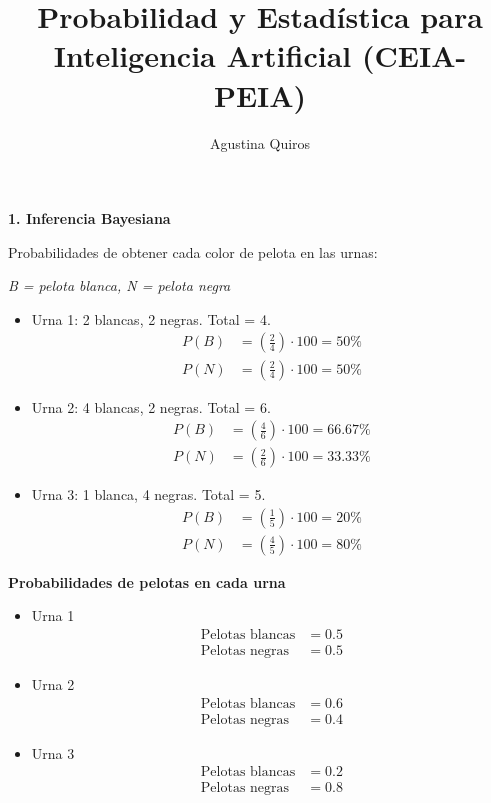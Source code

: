 \documentclass{article}
\title{\bf Probabilidad y Estadística para Inteligencia Artificial (CEIA-PEIA)}
\author{Agustina Quiros}
\begin{document}
\maketitle

{\bfseries 1. Inferencia Bayesiana} 

Probabilidades de obtener cada color de pelota en las urnas:

\textit{B = pelota blanca, N = pelota negra} 

\begin{itemize}
    \item Urna 1: 2 blancas, 2 negras. Total = 4.
    \begin{align*}
        P(B) &= \left(\frac{2}{4}\right) \cdot 100 = 50\% \\
        P(N) &= \left(\frac{2}{4}\right) \cdot 100 = 50\%
    \end{align*}
    \item Urna 2: 4 blancas, 2 negras. Total = 6.
    \begin{align*}
        P(B) &= \left(\frac{4}{6}\right) \cdot 100 = 66.67\% \\
        P(N) &= \left(\frac{2}{6}\right) \cdot 100 = 33.33\%
    \end{align*}
    \item Urna 3: 1 blanca, 4 negras. Total = 5.
    \begin{align*}
        P(B) &= \left(\frac{1}{5}\right) \cdot 100 = 20\% \\
        P(N) &= \left(\frac{4}{5}\right) \cdot 100 = 80\%
    \end{align*}
\end{itemize}

{\bfseries Probabilidades de pelotas en cada urna}
\begin{itemize}
    \item Urna 1
    \begin{align*}
        \text{Pelotas blancas} &= 0.5 \\
        \text{Pelotas negras} &= 0.5
    \end{align*}
    \item Urna 2
    \begin{align*}
        \text{Pelotas blancas} &= 0.6 \\
        \text{Pelotas negras} &= 0.4
    \end{align*}
    \item Urna 3
    \begin{align*}
        \text{Pelotas blancas} &= 0.2 \\
        \text{Pelotas negras} &= 0.8
    \end{align*}
\end{itemize}
\end{document}
